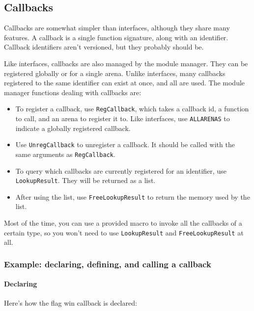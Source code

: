 \documentclass{article}
\begin{document}
\subsection{Callbacks}

Callbacks are somewhat simpler than interfaces, although they share many
features. A callback is a single function signature, along with an
identifier. Callback identifiers aren't versioned, but they probably
should be.

Like interfaces, callbacks are also managed by the module manager. They
can be registered globally or for a single arena. Unlike interfaces,
many callbacks registered to the same identifier can exist at once, and
all are used. The module manager functions dealing with callbacks are:

\begin{itemize}

\item To register a callback, use \verb/RegCallback/, which takes a
callback id, a function to call, and an arena to register it to. Like
interfaces, use \verb/ALLARENAS/ to indicate a globally registered
callback.

\item Use \verb/UnregCallback/ to unregister a callback. It should be
called with the same arguments as \verb/RegCallback/.

\item To query which callbacks are currently registered for an
identifier, use \verb/LookupResult/. They will be returned as a list.

\item After using the list, use \verb/FreeLookupResult/ to return the
memory used by the list.

\end{itemize}

Most of the time, you can use a provided macro to invoke all the
callbacks of a certain type, so you won't need to use
\verb/LookupResult/ and \verb/FreeLookupResult/ at all.


\subsubsection{Example: declaring, defining, and calling a callback}

\paragraph{Declaring}
Here's how the flag win callback is declared:
\end{document}
